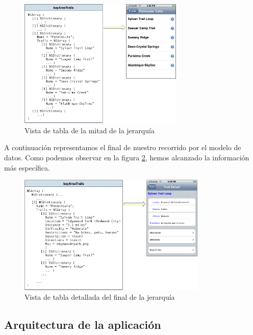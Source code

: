 \begin{figure}[ht!]
  \centering
    \includegraphics[width=0.7\textwidth]{./images/tv_datamodel_middle.jpg}
  \caption{Vista de tabla de la mitad de la jerarquía}
  \label{fig:table-view-middle}
\end{figure} 

 A continuación representamos el final de nuestro recorrido por el modelo de datos. Como podemos observar en la figura \ref{fig:detail-table-view}, hemos alcanzado la información más específica.

\begin{figure}[ht!]
  \centering
    \includegraphics[width=0.8\textwidth]{./images/tv_datamodel_detail.jpg}
  \caption{Vista de tabla detallada del final de la jerarquía }
  \label{fig:detail-table-view}
\end{figure} 


\subsection{Arquitectura de la aplicación}	
   

